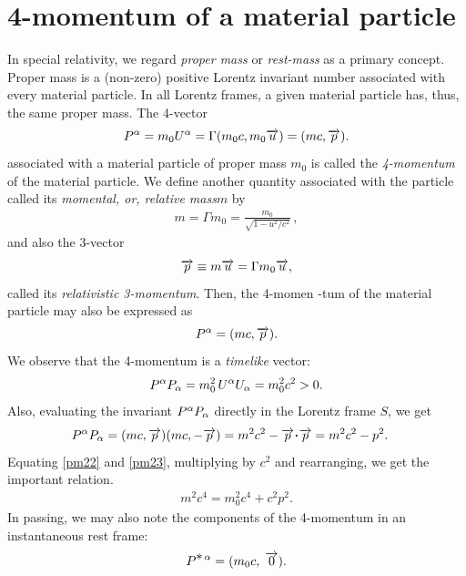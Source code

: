 \section{4-momentum of a material particle}
In special relativity, we regard \textsl{proper mass} 
or 
\textsl{rest-mass} as a primary concept. Proper mass is 
a 
(non-zero) positive Lorentz invariant number associated 
with 
every material particle. In all Lorentz frames, a 
given 
material particle has, thus, the same proper mass.  
The 
4-vector \begin{align}\label{pm20} P^{{\alpha}}=m_0 U^{{\alpha}} 
=\Gamma 
(m_0 c, m_0\overrightarrow{u})=(mc,\overrightarrow{p}). \end{align} 
associated 
with a material particle of proper mass $m_0$ is called 
 the 
\textsl{4-momentum} of the material particle. We 
define another quantity associated with the particle 
called 
its \textsl{momental, or, relative mass}$m$ by
\begin{align}\label{pmx21}
m=\Gamma m_0=\frac{m_0}{\sqrt{1-u^2/c^2}}\,,
\end{align}
and also the 3-vector
\begin{align}\label{pm21}
\overrightarrow{p}\equiv m\overrightarrow{u}=\Gamma m_0\overrightarrow{u},
\end{align}
called its \textsl{relativistic 3-momentum}. Then, the 
4-momen -tum of the material particle may also be 
expressed 
as \begin{align}\label{pmx22} P^{{\alpha}}=(mc,\overrightarrow{p}). 
\end{align} We observe that the  4-momentum is a 
\textsl{timelike} vector: \begin{align}\label{pm22} 
P^{{\alpha}} 
P_ {{\alpha}} =m_0^2\,U^{{\alpha}} U_ {{\alpha}} =m_0^2c^2 >0. 
\end{align} 
Also, evaluating the invariant $P^{{\alpha}} P_ {{\alpha}}$  
directly 
in the Lorentz frame $S$, we get
\begin{align}\label{pm23}
P^\gka P_ \gka& =(mc,\veca{p})(mc,-\veca{p})
=m^2c^2-\veca{p}\dotp\veca{p} =m^2c^2-p^2.
\end{align}
Equating \eqref{pm22} and \eqref{pm23}, multiplying by 
$ 
c^2$ and rearranging, we get the important relation.
\begin{align}\label{pm24}
m^2c^4=m_0^2c^4+c^2p^2.
\end{align}
In passing, we may also note the components of the 
4-momentum in an instantaneous rest frame:
 \begin{align}\label{pm25}
P^{{\textstyle \ast}\,{\alpha}}=(m_0 c,\; \overrightarrow{0}).
\end{align}

